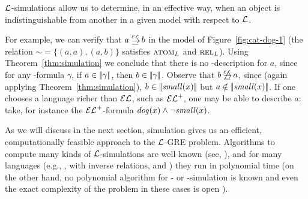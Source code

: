 $\mathcal{L}$-simulations allow us to determine, in an effective way,
when an object is indistinguishable from another in a given model with respect to $\mathcal{L}$.

For example, we can verify that $a \simul{\EL} b$ in the model of
Figure~\ref{fig:cat-dog-1} (the relation ${\sim} = \{(a,a), (a, b) \}
$ satisfies $\textsc{atom}_L$ and $\textsc{rel}_L$).
Using Theorem~\ref{thm:simulation}
we conclude that there is no \EL-description for $a$, since for any \EL-formula $\gamma$,
if $a\in|\!|\gamma|\!|$, then $b\in|\!|\gamma|\!|$.
Observe that $b \not\simul{\EL} a$, since
(again applying Theorem~\ref{thm:simulation}), $b\in|\!|\mathit{small}(x)|\!|$ but
$a\notin|\!|\mathit{small}(x)|\!|$.
%
If one chooses a language richer than $\mathcal{EL}$, such as ${\mathcal{EL}^+}$, one may be
able to describe $a$: take, for instance the ${\mathcal{EL}^+}$-formula
$\mathit{dog}(x)\wedge\lnot\mathit{small}(x)$.





As we will discuss in the next section, simulation gives us an
efficient, computationally feasible approach to the $\mathcal{L}$-GRE
problem. Algorithms to compute many kinds of $\mathcal{L}$-simulations are
well known (see, \cite{H71,PT87,HHK95,DPP03}), and for many
languages  (e.g., \ALC, \ALC with inverse relations,  \ELAN and \EL)
they run in polynomial time (on the other hand, no polynomial
algorithm for \FOL- or \EPFOL-simulation is known and even the exact
complexity of the problem in these cases is open
\cite{gare:comp79}).
